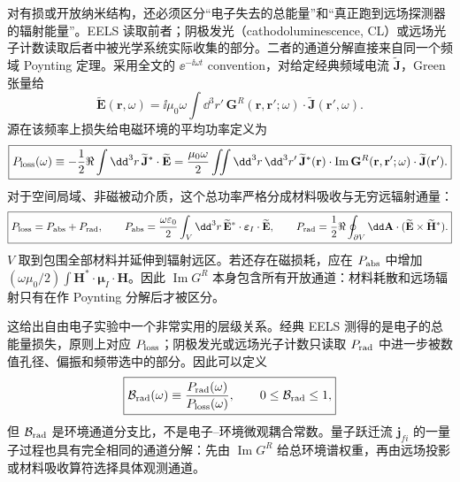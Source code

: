 对有损或开放纳米结构，还必须区分“电子失去的总能量”和“真正跑到远场探测器的辐射能量”。EELS 读取前者；阴极发光（cathodoluminescence, CL）或远场光子计数读取后者中被光学系统实际收集的部分。二者的通道分解直接来自同一个频域 Poynting 定理。采用全文的 $\ee^{-\ii\omega t}$ convention，对给定经典频域电流 $\widetilde{\mathbf J}$，Green 张量给
\[
\widetilde{\mathbf E}(\mathbf r,\omega)
=\ii\mu_0\omega\int\dd^3r'\,
\mathbf G^R(\mathbf r,\mathbf r';\omega)\cdot
\widetilde{\mathbf J}(\mathbf r',\omega).
\]
源在该频率上损失给电磁环境的平均功率定义为
\begin{equation}
\boxed{
P_{\rm loss}(\omega)
\equiv
-\frac12\Re\int\dd^3r\,
\widetilde{\mathbf J}^{*}\cdot\widetilde{\mathbf E}
=\frac{\mu_0\omega}{2}
\iint\dd^3r\,\dd^3r'\,
\widetilde{\mathbf J}^{*}(\mathbf r)\cdot
\operatorname{Im}\mathbf G^R(\mathbf r,\mathbf r';\omega)
\cdot\widetilde{\mathbf J}(\mathbf r').}
\label{eq:source_total_loss_green_power}
\end{equation}
对于空间局域、非磁被动介质，这个总功率严格分成材料吸收与无穷远辐射通量：
\begin{equation}
\boxed{
P_{\rm loss}=P_{\rm abs}+P_{\rm rad},
\qquad
P_{\rm abs}
=\frac{\omega\varepsilon_0}{2}
\int_V\dd^3r\,
\widetilde{\mathbf E}^{*}\cdot
\boldsymbol\varepsilon_I\cdot
\widetilde{\mathbf E},
\qquad
P_{\rm rad}
=\frac12\Re\oint_{\partial V}\dd\mathbf A\cdot
(\widetilde{\mathbf E}\times\widetilde{\mathbf H}^{*}).}
\label{eq:loss_absorption_radiation_decomposition}
\end{equation}
$V$ 取到包围全部材料并延伸到辐射远区。若还存在磁损耗，应在 $P_{\rm abs}$ 中增加
$(\omega\mu_0/2)\int \mathbf H^*\cdot\boldsymbol\mu_I\cdot\mathbf H$。因此 $\operatorname{Im}G^R$ 本身包含所有开放通道：材料耗散和远场辐射只有在作 Poynting 分解后才被区分。

这给出自由电子实验中一个非常实用的层级关系。经典 EELS 测得的是电子的总能量损失，原则上对应 $P_{\rm loss}$；阴极发光或远场光子计数只读取 $P_{\rm rad}$ 中进一步被数值孔径、偏振和频带选中的部分。因此可以定义
\begin{equation}
\boxed{
\mathcal B_{\rm rad}(\omega)
\equiv\frac{P_{\rm rad}(\omega)}{P_{\rm loss}(\omega)},
\qquad 0\le\mathcal B_{\rm rad}\le1,}
\label{eq:radiative_branching_efficiency_green}
\end{equation}
但 $\mathcal B_{\rm rad}$ 是环境通道分支比，不是电子--环境微观耦合常数。量子跃迁流 $\mathbf j_{fi}$ 的一量子过程也具有完全相同的通道分解：先由 $\operatorname{Im}G^R$ 给总环境谱权重，再由远场投影或材料吸收算符选择具体观测通道。

